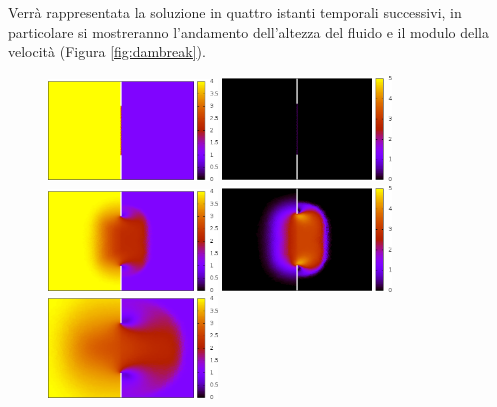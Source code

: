 Verrà rappresentata la soluzione in quattro istanti temporali successivi, in particolare si mostreranno l'andamento dell'altezza del fluido e il modulo della velocità (Figura \ref{fig:dambreak}).

\begin{figure}[htbp]
\centering
\includegraphics[width=0.4\textwidth]{images/DamBreak/height-solution0000.png} \hspace{0.2cm} 
\includegraphics[width=0.4\textwidth]{images/DamBreak/velocity-solution0000.png} \\[0.5cm]
\includegraphics[width=0.4\textwidth]{images/DamBreak/height-solution0200.png} \hspace{0.2cm}
\includegraphics[width=0.4\textwidth]{images/DamBreak/velocity-solution0200.png}  \\[0.5cm] 
\includegraphics[width=0.4\textwidth]{images/DamBreak/height-solution0500.png}  \hspace{0.2cm}

\end{figure}
